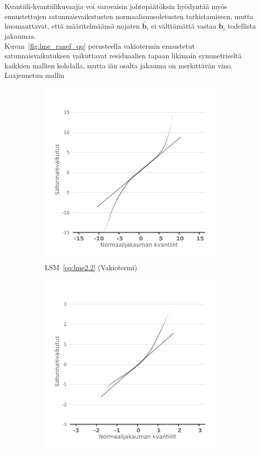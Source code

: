 \documentclass[finnish]{docopts}
\begin{document}
Kvantiili-kvantiilikuvaajia voi varovaisin johtopäätöksin hyödyntää myös ennustettujen satunnaisvaikutusten normaalisuusoletusten tarkistamiseen, mutta \cite{burzykowski13} huomauttavat, että määritelmäänsä nojaten $\hat{\bm{b}}_i$ ei välttämättä vastaa $\bm{b}_i$ todellista jakaumaa.\\

Kuvan~\ref{fig:lme_ranef_qq} perusteella vakiotermin ennustetut satunnaisvaikutuksen vaikuttavat residuaalien tapaan likimain symmetriseltä kaikkien mallien kohdalla, mutta iän osalta jakauma on merkittävän vino. Laajennetun mallin \\

\begin{figure}[H]
\centering
\begin{subfigure}[b]{0.4\textwidth}
\centering
  \includegraphics[width=.8\linewidth]{kuvaajat/lme3_qq_ranef_int.png}
  \caption{$\text{LSM}$~\ref{eq:lme2.2} (Vakiotermi)}
  \label{fig:lme_krit_int_qq}
\end{subfigure}%
\begin{subfigure}[b]{0.4\textwidth}
\centering
  \includegraphics[width=.8\linewidth]{kuvaajat/lme3_qq_ranef_ika.png}

\end{subfigure}
\end{figure}
\end{document}
